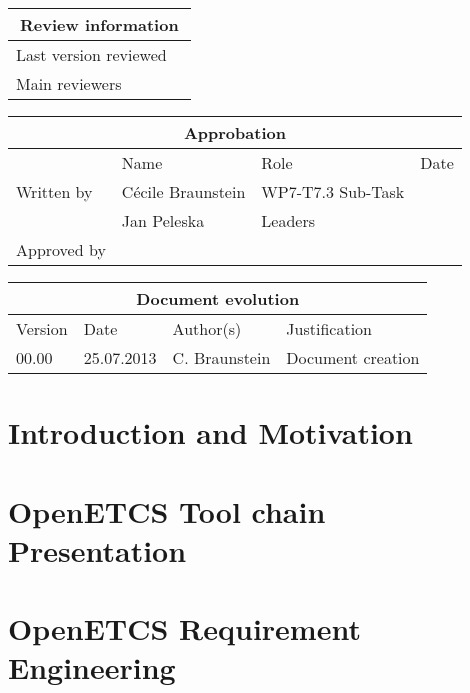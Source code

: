 \documentclass{openetcs_report}
\begin{document}
\begin{tabular}{|p{4.4cm}|p{8.7cm}|}
\hline
\multicolumn{2}{|c|}{Review information} \\
\hline
Last version reviewed &  \\
\hline
Main reviewers & \\
\hline
\end{tabular}

\begin{tabular}{|p{2.2cm}|p{4cm}|p{4cm}|p{2cm}|}
\hline
\multicolumn{4}{|c|}{Approbation} \\
\hline
  &  Name & Role & Date   \\
\hline  
Written by    &  Cécile Braunstein & WP7-T7.3 Sub-Task  & \\
& Jan Peleska & Leaders&\\
\hline
Approved by & &  & \\
\hline
\end{tabular}

\begin{tabular}{|p{2.2cm}|p{2cm}|p{3cm}|p{5cm}|}
\hline
\multicolumn{4}{|c|}{Document evolution} \\
\hline
Version &  Date & Author(s) & Justification  \\
\hline  
00.00 & 25.07.2013 & C. Braunstein  &  Document creation  \\
\hline  
\end{tabular}
\newpage


\printglossary
\mainmatter
\chapter{Introduction and Motivation}



\chapter{OpenETCS Tool chain Presentation}
\label{chap:toolchaindef}



\chapter{OpenETCS Requirement Engineering}
\label{chap:reqhandling}
\end{document}
